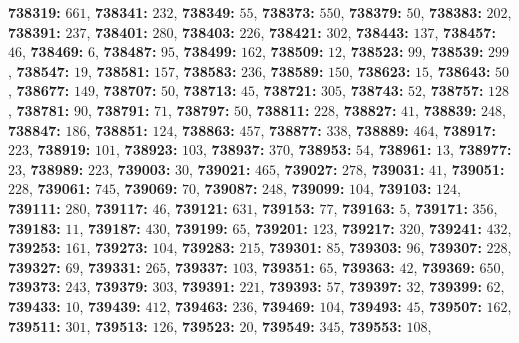 \textsf{\bfseries 738319:} $661$, \textsf{\bfseries 738341:} $232$, \textsf{\bfseries 738349:} $55$, \textsf{\bfseries 738373:} $550$, \textsf{\bfseries 738379:} $50$, \textsf{\bfseries 738383:} $202$, \textsf{\bfseries 738391:} $237$, \textsf{\bfseries 738401:} $280$, \textsf{\bfseries 738403:} $226$, \textsf{\bfseries 738421:} $302$, \textsf{\bfseries 738443:} $137$, \textsf{\bfseries 738457:} $46$, \textsf{\bfseries 738469:} $6$, \textsf{\bfseries 738487:} $95$, \textsf{\bfseries 738499:} $162$, \textsf{\bfseries 738509:} $12$, \textsf{\bfseries 738523:} $99$, \textsf{\bfseries 738539:} $299$, \textsf{\bfseries 738547:} $19$, \textsf{\bfseries 738581:} $157$, \textsf{\bfseries 738583:} $236$, \textsf{\bfseries 738589:} $150$, \textsf{\bfseries 738623:} $15$, \textsf{\bfseries 738643:} $50$, \textsf{\bfseries 738677:} $149$, \textsf{\bfseries 738707:} $50$, \textsf{\bfseries 738713:} $45$, \textsf{\bfseries 738721:} $305$, \textsf{\bfseries 738743:} $52$, \textsf{\bfseries 738757:} $128$, \textsf{\bfseries 738781:} $90$, \textsf{\bfseries 738791:} $71$, \textsf{\bfseries 738797:} $50$, \textsf{\bfseries 738811:} $228$, \textsf{\bfseries 738827:} $41$, \textsf{\bfseries 738839:} $248$, \textsf{\bfseries 738847:} $186$, \textsf{\bfseries 738851:} $124$, \textsf{\bfseries 738863:} $457$, \textsf{\bfseries 738877:} $338$, \textsf{\bfseries 738889:} $464$, \textsf{\bfseries 738917:} $223$, \textsf{\bfseries 738919:} $101$, \textsf{\bfseries 738923:} $103$, \textsf{\bfseries 738937:} $370$, \textsf{\bfseries 738953:} $54$, \textsf{\bfseries 738961:} $13$, \textsf{\bfseries 738977:} $23$, \textsf{\bfseries 738989:} $223$, \textsf{\bfseries 739003:} $30$, \textsf{\bfseries 739021:} $465$, \textsf{\bfseries 739027:} $278$, \textsf{\bfseries 739031:} $41$, \textsf{\bfseries 739051:} $228$, \textsf{\bfseries 739061:} $745$, \textsf{\bfseries 739069:} $70$, \textsf{\bfseries 739087:} $248$, \textsf{\bfseries 739099:} $104$, \textsf{\bfseries 739103:} $124$, \textsf{\bfseries 739111:} $280$, \textsf{\bfseries 739117:} $46$, \textsf{\bfseries 739121:} $631$, \textsf{\bfseries 739153:} $77$, \textsf{\bfseries 739163:} $5$, \textsf{\bfseries 739171:} $356$, \textsf{\bfseries 739183:} $11$, \textsf{\bfseries 739187:} $430$, \textsf{\bfseries 739199:} $65$, \textsf{\bfseries 739201:} $123$, \textsf{\bfseries 739217:} $320$, \textsf{\bfseries 739241:} $432$, \textsf{\bfseries 739253:} $161$, \textsf{\bfseries 739273:} $104$, \textsf{\bfseries 739283:} $215$, \textsf{\bfseries 739301:} $85$, \textsf{\bfseries 739303:} $96$, \textsf{\bfseries 739307:} $228$, \textsf{\bfseries 739327:} $69$, \textsf{\bfseries 739331:} $265$, \textsf{\bfseries 739337:} $103$, \textsf{\bfseries 739351:} $65$, \textsf{\bfseries 739363:} $42$, \textsf{\bfseries 739369:} $650$, \textsf{\bfseries 739373:} $243$, \textsf{\bfseries 739379:} $303$, \textsf{\bfseries 739391:} $221$, \textsf{\bfseries 739393:} $57$, \textsf{\bfseries 739397:} $32$, \textsf{\bfseries 739399:} $62$, \textsf{\bfseries 739433:} $10$, \textsf{\bfseries 739439:} $412$, \textsf{\bfseries 739463:} $236$, \textsf{\bfseries 739469:} $104$, \textsf{\bfseries 739493:} $45$, \textsf{\bfseries 739507:} $162$, \textsf{\bfseries 739511:} $301$, \textsf{\bfseries 739513:} $126$, \textsf{\bfseries 739523:} $20$, \textsf{\bfseries 739549:} $345$, \textsf{\bfseries 739553:} $108$, 
